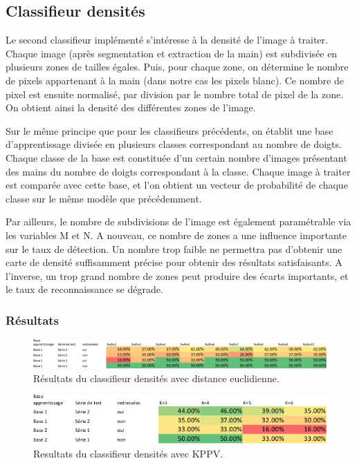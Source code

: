 \subsection{Classifieur densités}

Le second classifieur implémenté s'intéresse à la densité de l'image à traiter. Chaque image (après segmentation et extraction de la main) est subdivisée en plusieurs zones de tailles égales. Puis, pour chaque zone, on détermine le nombre de pixels appartenant à la main (dans notre cas les pixels blanc). Ce nombre de pixel est ensuite normalisé, par division par le nombre total de pixel de la zone. On obtient ainsi la densité des différentes zones de l'image.

	Sur le même principe que pour les classifieurs précédents, on établit une base d'apprentissage divisée en plusieurs classes correspondant au nombre de doigts. Chaque classe de la base est constituée d'un certain nombre d'images présentant des mains du nombre de doigts correspondant à la classe. Chaque image à traiter est comparée avec cette base, et l'on obtient un vecteur de probabilité de chaque classe sur le même modèle que précédemment.

	Par ailleurs, le nombre de subdivisions de l'image est également paramétrable via les variables M et N. A nouveau, ce nombre de zones a une influence importante sur le taux de détection. Un nombre trop faible ne permettra pas d'obtenir une carte de densité suffisamment précise pour obtenir des résultats satisfaisants. A l'inverse, un trop grand nombre de zones peut produire des écarts importants, et le taux de reconnaissance se dégrade.

\subsubsection{Résultats}
\begin{figure}[htb!]
\centerline{\includegraphics[scale=0.7]{table2.png}}
\caption{Résultats du classifieur densités avec distance euclidienne.}
\end{figure}

\begin{figure}[htb!]
\centerline{\includegraphics[scale=0.7]{table3.png}}
\caption{Resultats du classifieur densités avec KPPV.}
\end{figure}